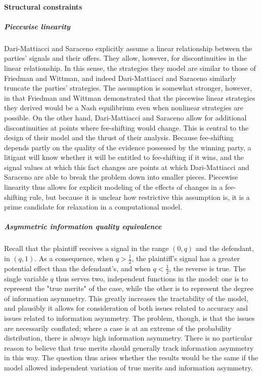 \documentclass{article}
\begin{document}
\paragraph{Structural constraints}
\subparagraph{Piecewise linearity} Dari-Mattiacci and Saraceno explicitly assume a linear relationship between the parties' signals and their offers. They allow, however, for discontinuities in the linear relationship. In this sense, the strategies they model are similar to those of Friedman and Wittman, and indeed Dari-Mattiacci and Saraceno similarly truncate the parties' strategies. The assumption is somewhat stronger, however, in that Friedman and Wittman demonstrated that the piecewise linear strategies they derived would be a Nash equilibrium even when nonlinear strategies are possible. On the other hand, Dari-Mattiacci and Saraceno allow for additional discontinuities at points where fee-shifting would change. This is central to the design of their model and the thrust of their analysis. Because fee-shifting depends partly on the quality of the evidence possessed by the winning party, a litigant will know whether it will be entitled to fee-shifting if it wins, and the signal values at which this fact changes are points at which Dari-Mattiacci and Saraceno are able to break the problem down into smaller pieces. Piecewise linearity thus allows for explicit modeling of the effects of changes in a fee-shifting rule, but because it is unclear how restrictive this assumption is, it is a prime candidate for relaxation in a computational model.
\subparagraph{Asymmetric information quality equivalence} Recall that the plaintiff receives a signal in the range $(0,q)$ and the defendant, in $(q,1)$. As a consequence, when $q > \frac{1}{2}$, the plaintiff's signal has a greater potential effect than the defendant's, and when $q < \frac{1}{2}$, the reverse is true. The single variable $q$ thus serves two, independent functions in the model: one is to represent the "true merits" of the case, while the other is to represent the degree of information asymmetry. This greatly increases the tractability of the model, and plausibly it allows for consideration of both issues related to accuracy and issues related to information asymmetry. The problem, though, is that the issues are necessarily conflated; where a case is at an extreme of the probability distribution, there is always high information asymmetry. There is no particular reason to believe that true merits should generally track information asymmetry in this way. The question thus arises whether the results would be the same if the model allowed independent variation of true merits and information asymmetry. 
\end{document}

